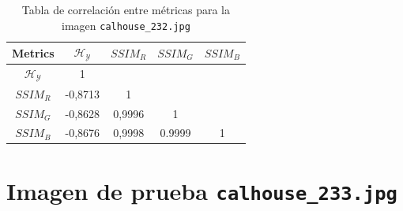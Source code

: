 \begin{table}[H]
\setlength{\abovecaptionskip}{2pt plus 3pt minus 2pt} %
\caption[Parámetros de entrada para $MOPSO$]{Tabla de correlación entre métricas para la imagen \texttt{calhouse\_232.jpg}}
\begin{center}
 \begin{tabular}{||c | c c c c||} 
 \hline
Metrics & $\mathscr{H_Y}$ & $SSIM_R$ & $SSIM_G$ & $SSIM_B$ \\ 
\hline
$\mathscr{H_Y}$ & 1 &  &  & \\ 
\hline
$SSIM_R$ & -0,8713 & 1 &  \\ 
\hline
$SSIM_G$ & -0,8628 & 0,9996  & 1  & \\ 
\hline
$SSIM_B$ & -0,8676 & 0,9998  & 0.9999  & 1 \\ 
\hline
\end{tabular}
\end{center}
\label{table:correlacion}
\end{table}


\section{Imagen de prueba \texttt{calhouse\_233.jpg}}

